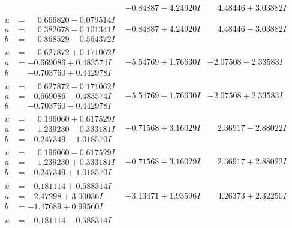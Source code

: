 \documentclass[1p]{elsarticle_modified}
\theoremstyle{definition}
\begin{document}
$$\begin{array}{c|c|c}
 & -0.84887 - 4.24920 I & \phantom{-}4.48446 + 3.03882 I \\ \hline\begin{aligned}
u &= \phantom{-}0.666820 - 0.079514 I \\
a &= \phantom{-}0.382678 - 0.101341 I \\
b &= \phantom{-}0.868529 - 0.564372 I\end{aligned}
 & -0.84887 + 4.24920 I & \phantom{-}4.48446 - 3.03882 I \\ \hline\begin{aligned}
u &= \phantom{-}0.627872 + 0.171062 I \\
a &= -0.669086 + 0.483574 I \\
b &= -0.703760 + 0.442978 I\end{aligned}
 & -5.54769 + 1.76630 I & -2.07508 - 2.33583 I \\ \hline\begin{aligned}
u &= \phantom{-}0.627872 - 0.171062 I \\
a &= -0.669086 - 0.483574 I \\
b &= -0.703760 - 0.442978 I\end{aligned}
 & -5.54769 - 1.76630 I & -2.07508 + 2.33583 I \\ \hline\begin{aligned}
u &= \phantom{-}0.196060 + 0.617529 I \\
a &= \phantom{-}1.239230 - 0.333181 I \\
b &= -0.247349 - 1.018570 I\end{aligned}
 & -0.71568 + 3.16029 I & \phantom{-}2.36917 - 2.88022 I \\ \hline\begin{aligned}
u &= \phantom{-}0.196060 - 0.617529 I \\
a &= \phantom{-}1.239230 + 0.333181 I \\
b &= -0.247349 + 1.018570 I\end{aligned}
 & -0.71568 - 3.16029 I & \phantom{-}2.36917 + 2.88022 I \\ \hline\begin{aligned}
u &= -0.181114 + 0.588314 I \\
a &= -2.47298 + 3.00036 I \\
b &= -1.47689 + 0.99560 I\end{aligned}
 & -3.13471 + 1.93596 I & \phantom{-}4.26373 + 2.32250 I \\ \hline\begin{aligned}
u &= -0.181114 - 0.588314 I \\

\end{aligned}
\end{array}$$
\end{document}
